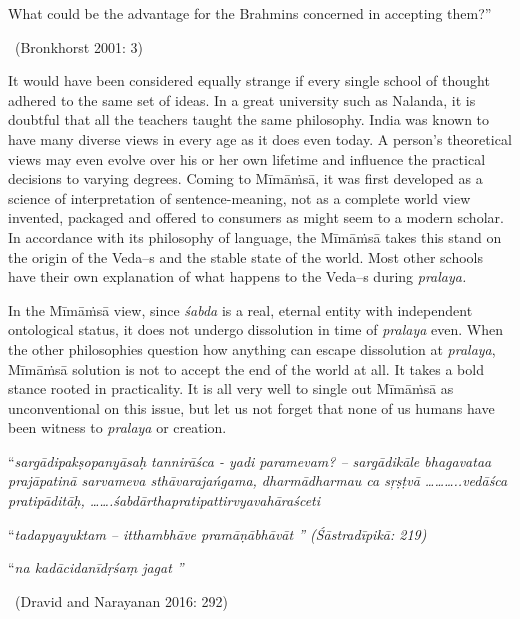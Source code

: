 \begin{myquote}
What could be the advantage for the Brahmins concerned in accepting them?” 

~\hfill (Bronkhorst 2001: 3)
\end{myquote}

It would have been considered equally strange if every single school of thought adhered to the same set of ideas. In a great university such as Nalanda, it is doubtful that all the teachers taught the same philosophy. India was known to have many diverse views in every age as it does even today. A person’s theoretical views may even evolve over his or her own lifetime and influence the practical decisions to varying degrees. Coming to Mīmāṁsā, it was first developed as a science of interpretation of sentence-meaning, not as a complete world view invented, packaged and offered to consumers as might seem to a modern scholar. In accordance with its philosophy of language, the Mīmāṁsā takes this stand on the origin of the Veda--s and the stable state of the world. Most other schools have their own explanation of what happens to the Veda--s during \textit{pralaya.}

In the Mīmāṁsā view, since \textit{śabda} is a real, eternal entity with independent ontological status, it does not undergo dissolution in time of \textit{pralaya} even. When the other philosophies question how anything can escape dissolution at \textit{pralaya}, Mīmāṁsā solution is not to accept the end of the world at all. It takes a bold stance rooted in practicality. It is all very well to single out Mīmāṁsā as unconventional on this issue, but let us not forget that none of us humans have been witness to \textit{pralaya} or creation.

\begin{myquote}
“\textit{sargādipakṣopanyāsaḥ tannirāśca  - yadi paramevam? – sargādikāle bhagavataa prajāpatinā sarvameva sthāvarajańgama, dharmādharmau ca sŗṣṭvā ………..vedāśca pratipāditāḥ, …….śabdārthapratipattirvyavahāraśceti }
\end{myquote}

\begin{myquote}
“\textit{tadapyayuktam – itthambhāve pramāṇābhāvāt ” (Śāstradīpikā: 219)}
\end{myquote}

\begin{myquote}
“\textit{na kadācidanīdṛśaṃ jagat ”}

~\hfill (Dravid and Narayanan 2016: 292)
\end{myquote}

